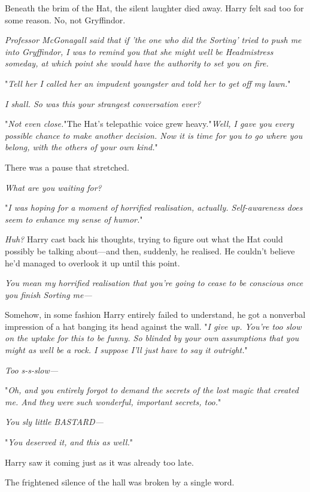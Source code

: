Beneath the brim of the Hat, the silent laughter died away. Harry felt sad too 
for some reason. No, not Gryffindor.

\emph{Professor McGonagall said that if 'the one who did the Sorting' tried to 
push me into Gryffindor, I was to remind you that she might well be 
Headmistress someday, at which point she would have the authority to set you on 
fire.}

"\emph{Tell her I called her an impudent youngster and told her to get off my 
lawn.}"

\emph{I shall. So was this your strangest conversation ever?}

"\emph{Not even close.}"The Hat's telepathic voice grew heavy."\emph{Well, I 
gave you every possible chance to make another decision. Now it is time for you 
to go where you belong, with the others of your own kind.}"

There was a pause that stretched.

\emph{What are you waiting for?}

"\emph{I was hoping for a moment of horrified realisation, actually. 
Self-awareness does seem to enhance my sense of humor.}"

\emph{Huh?} Harry cast back his thoughts, trying to figure out what the Hat 
could possibly be talking about---and then, suddenly, he realised. He couldn't 
believe he'd managed to overlook it up until this point.

\emph{You mean my horrified realisation that you're going to cease to be 
conscious once you finish Sorting me---}

Somehow, in some fashion Harry entirely failed to understand, he got a 
nonverbal impression of a hat banging its head against the wall. "\emph{I give 
up. You're too slow on the uptake for this to be funny. So blinded by your own 
assumptions that you might as well be a rock. I suppose I'll just have to say 
it outright.}"

\emph{Too s-s-slow---}

"\emph{Oh, and you entirely forgot to demand the secrets of the lost magic that 
created me. And they were such wonderful, important secrets, too.}"

\emph{You sly little BASTARD---}

"\emph{You deserved it, and this as well.}"

Harry saw it coming just as it was already too late.

The frightened silence of the hall was broken by a single word.

